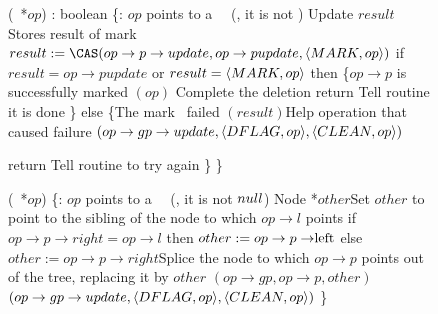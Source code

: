 \begin{figure*}
\begin{code}
(\DFlag\ *$op$) : boolean \{\ul
\n   {}:  $op$ points to a \DFlag\ \record\  (\ie, it is not \NULL)\nl%
     Update $result$ \tabtabcom Stores result of mark \CAS\bl\nl
     $result := \CAS(op\rightarrow p\rightarrow update, op\rightarrow pupdate, \langle \mk, op\rangle)$ \label{mark-cas}\nl     
     if $result = op\rightarrow pupdate$ or $result = \langle M\scriptsize ARK \normalsize, op\rangle$ then \label{checkmark}\{\tabtabcom $op\rightarrow p$ is successfully marked\nl
\n          {}$(op)$ \label{call-hm1} \tabtabcom Complete the deletion\nl
            return \TRUE\tabtabcom Tell  routine it is done\nl
\p       \}\nl
         else \{\tabtabcom The mark \CAS\ failed \nl
\n              
                $(result)$\label{help-after-failed-mark}\tabtabcom Help operation that caused failure\nl
                \CAS$(op\rightarrow gp\rightarrow update, \langle DF\scriptsize LAG \normalsize, op\rangle, \langle C\scriptsize LEAN \normalsize, op\rangle)$ \label{backtrack-cas}\nl
               
     			return \FALSE\tabtabcom Tell  routine to try again\nl
\p       \}\nl
\p
\}\bl
\nl

(\DFlag\ *$op$) \{\ul
\n   {}:  $op$ points to a \DFlag\ \record\  (\ie, it is not $null$)\nl
     Node *$other$\bl\ul
     \com Set $other$ to point to the sibling of the node to which  $op\rightarrow l$ points \nl
     if $op\rightarrow p\rightarrow right = op\rightarrow l$ then $other := op\rightarrow p \rightarrow \lft$ else $other:=op\rightarrow p\rightarrow right$\label{read-other}\ul 
     \com Splice the node to which $op\rightarrow p$ points out of the tree, replacing it by $other$\nl
     $(op\rightarrow gp, op\rightarrow p, other)$ \label{dchild-cas}\nl
     \CAS$(op\rightarrow gp\rightarrow update, \langle DF\scriptsize LAG \normalsize, op\rangle, \langle C\scriptsize LEAN \normalsize, op\rangle)$ \label{dunflag-cas}\nl
\p
\}\bl\nl


\end{code}
\end{figure*}

